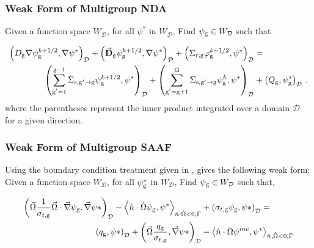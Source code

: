 \subsubsection{Weak Form of Multigroup NDA}

Given a function space $W_\mathcal{D}$, for all $\psi^*$ in $W_\mathcal{D}$, Find $\psi_{\mathrm{g}} \in W_\mathcal{D}$ such that

\begin{equation}
 \begin{split}
  \left(D_{\mathrm{g}} \nabla \psi_{\mathrm{g}}^{k+1/2}, \nabla \psi^*\right)_\mathcal{D} + \left(\vec{\bf{D}}_{\mathrm{g}} \psi_{\mathrm{g}}^{k+1/2} , \nabla \psi^*\right)_\mathcal{D} +  \left(\Sigma_{r,\mathrm{g}} \varphi_{\mathrm{g}}^{k+1/2}, \psi^*\right)_\mathcal{D} &=  \\
   \left(\sum\limits_{\substack{\mathrm{g}'=1}}^{\mathrm{g-1}} \Sigma_{\mathrm{s},\mathrm{g}' \to\mathrm{g}}\psi_{\mathrm{g}}^{k+1/2}, \psi^*\right)_\mathcal{D} + \left(\sum\limits_{\substack{\mathrm{g}'=\mathrm{g}+1}}^{\mathrm{G}} \Sigma_{\mathrm{s},\mathrm{g}' \to\mathrm{g}}\psi_{\mathrm{g}}^{k}, \psi^*\right)_\mathcal{D} 
  &+ \left(Q_{\mathrm{g}}, \psi^*_{\mathrm{g}}\right)_\mathcal{D} \:.
 \end{split}
 \label{k1/2}
\end{equation}
%
where the parentheses represent the inner product integrated over a domain $\mathcal{D}$ for a given direction.

\subsubsection{Weak Form of Multigroup SAAF}
Using the boundary condition treatment given in \cite{zheng-thesis}, gives the following weak form:
Given a function space $W_\mathcal{D}$, for all $\psi^*_{\mathrm{g}}$ in $W_\mathcal{D}$, Find $\psi_{\mathrm{g}} \in W_\mathcal{D}$ such that,

\begin{equation}
    \begin{split}
        \left ( \vec{\Omega}\frac{1}{\sigma_{t, \mathrm{g}}}\vec{\Omega}\cdot \vec{\nabla}\psi_{\mathrm{g}}, \vec{\nabla}\psi* \right)_\mathcal{D} -     \left < \hat{n} \cdot \hat{\Omega}\psi_{\mathrm{g}}, \psi^* \right>_{\hat{n} \cdot \hat{\Omega} < 0, \Gamma} &+ \left ( \sigma_{t, \mathrm{g}} \psi_{\mathrm{g}}, \psi* \right )_\mathcal{D} = \\
        \left ( q_{\mathrm{g}}, \psi* \right)_\mathcal{D} + \left ( \vec{\Omega} \frac{q_{\mathrm{g}}}{\sigma_{t, \mathrm{g}}}, \vec{\nabla}\psi* \right)_\mathcal{D} &- \left < \hat{n} \cdot {\Omega} \psi^{inc}, \psi^* \right>_{\hat{n}, \hat{\Omega} <0, \Gamma} 
    \end{split}
\end{equation}

